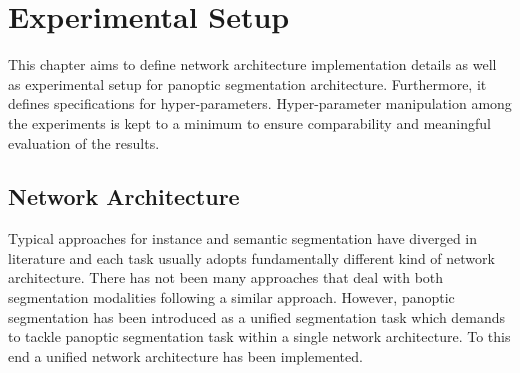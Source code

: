 
\chapter{Experimental Setup}
\label{sec:experimentatl_setup}


This chapter aims to define network architecture implementation details as well as experimental setup for panoptic segmentation architecture. Furthermore, it defines specifications for hyper-parameters. Hyper-parameter manipulation among
the experiments is kept to a minimum to ensure comparability and meaningful evaluation of the results.


\section{Network Architecture}


Typical approaches for instance and semantic segmentation have diverged in literature and each task usually
adopts fundamentally different kind of network architecture. There has not been many approaches that deal with both segmentation modalities following a similar approach. However, panoptic segmentation has been introduced as a unified segmentation task \cite{DBLP_panootic_seg:journals/corr/abs-1801-00868} which demands to tackle panoptic segmentation task within a single network architecture. To this end a unified network architecture has been implemented. 


